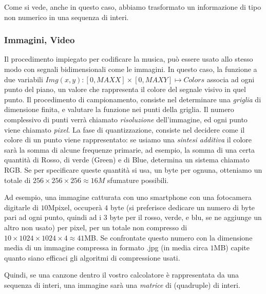 Come si vede, anche in questo caso, abbiamo trasformato un informazione di tipo
non numerico in una sequenza di interi.

\subsubsection{Immagini, Video}

Il procedimento impiegato per codificare la musica, può essere usato allo stesso
modo con segnali bidimensionali come le immagini. In questo caso, la funzione a due variabili $Img(x,y): [0,MAXX]\times[0,MAXY] \mapsto Colors$ associa ad ogni punto del piano, un valore che rappresenta il colore del segnale visivo in quel punto. Il procedimento di campionamento, consiste nel determinare una \emph{griglia} di dimensione finita, e valutare la funzione nei punti della griglia. Il numero complessivo di punti verrà chiamato \emph{risoluzione} dell'immagine, ed ogni punto viene chiamato \emph{pixel}. La fase di quantizzazione, consiste nel decidere come il colore di un punto viene rappresentato: se usiamo una \emph{sintesi additiva} il colore sarà la somma di alcune frequenze primarie, ad esempio, la somma di una certa quantità di Rosso, di verde (Green) e di Blue, determina un sistema chiamato \textsf{RGB}. Se
per specificare queste quantità si usa, un byte per ognuna, otteniamo un totale di $256 \times 256 \times 256 \approx 16M$ sfumature possibili.

Ad esempio, una immagine catturata con uno smartphone con una fotocamera digitarle di $10$Mpixel, occuperà $4$ byte (si preferisce dedicare un numero di byte pari ad ogni punto, quindi ad i $3$ byte per il rosso, verde, e blu, se ne aggiunge un altro non usato) per pixel, per un totale non compresso di $10 \times 1024 \times 1024 \times 4 \approx 41$MB. Se confrontate questo numero con la dimensione media di un immagine compressa in formato \textsf{.jpg} (in media circa $1$MB) capite quanto siano efficaci gli algoritmi di compressione usati.

Quindi, se una canzone dentro il vostro calcolatore è rappresentata da una sequenza di interi, una immagine sarà una \emph{matrice} di (quadruple) di interi.
